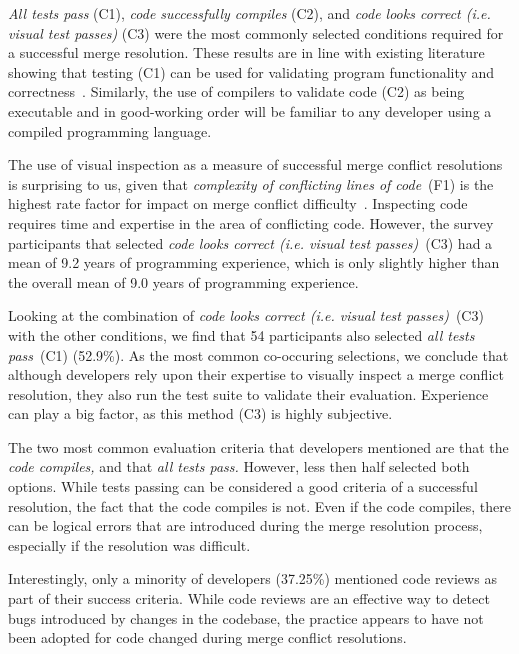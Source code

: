 \textit{All tests pass} (C1), \textit{code successfully compiles} (C2), and \textit{code looks correct (i.e. visual test passes)} (C3) were the most commonly selected conditions required for a successful merge resolution.
These results are in line with existing literature showing that testing (C1) can be used for validating program functionality and correctness~\cite{beizer1984software,tian2005software}. %
Similarly, the use of compilers to validate code (C2) as being executable and in good-working order will be familiar to any developer using a compiled programming language.

The use of visual inspection as a measure of successful merge conflict resolutions is surprising to us, given that \textit{complexity of conflicting lines of code}~(F1) is the highest rate factor for impact on merge conflict difficulty~\cite{mckee2017software}.
Inspecting code requires time and expertise in the area of conflicting code.
However, the survey participants that selected \textit{code looks correct (i.e. visual test passes)}~(C3) had a mean of 9.2 years of programming experience, which is only slightly higher than the overall mean of 9.0 years of programming experience.

Looking at the combination of \textit{code looks correct (i.e. visual test passes)}~(C3) with the other conditions, we find that 54 participants also selected \textit{all tests pass}~(C1) (52.9\%).
As the most common co-occuring selections, we conclude that although developers rely upon their expertise to visually inspect a merge conflict resolution, they also run the test suite to validate their evaluation.
Experience can play a big factor, as this method (C3) is highly subjective.

The two most common evaluation criteria that developers mentioned are that the \emph{code compiles,} and that \emph{all tests pass.}
However, less then half selected both options.
While tests passing can be considered a good criteria of a successful resolution, the fact that the code compiles is not.
Even if the code compiles, there can be logical errors that are introduced during the merge resolution process, especially if the resolution was difficult.

Interestingly, only a minority of developers (37.25\%) mentioned code reviews as part of their success criteria.
While code reviews are an effective way to detect bugs introduced by changes in the codebase, the practice appears to have not been adopted for code changed during merge conflict resolutions.

